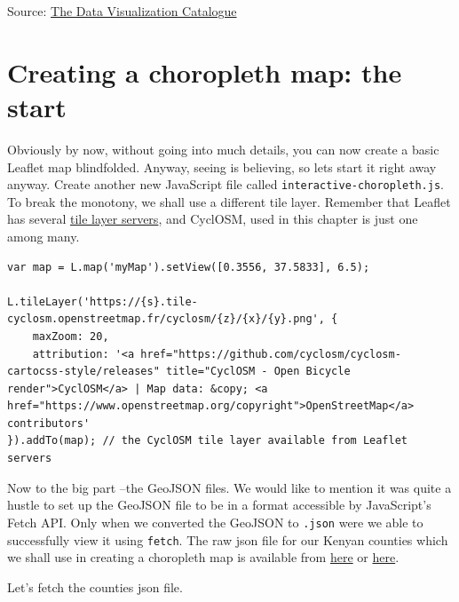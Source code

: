 \documentclass[
]{book}
\begin{document}
Source: \href{https://www.google.com/url?sa=i\&url=https\%3A\%2F\%2Fdatavizcatalogue.com\%2Fmethods\%2Fchoropleth.html\&psig=AOvVaw2doHr7xcU75mGuozmp6T5M\&ust=1689793060222000\&source=images\&cd=vfe\&opi=89978449\&ved=0CBMQjhxqFwoTCJiIu-v3mIADFQAAAAAdAAAAABAE}{The Data Visualization Catalogue}

\hypertarget{creating-a-choropleth-map-the-start}{%
\section{Creating a choropleth map: the start}\label{creating-a-choropleth-map-the-start}}

Obviously by now, without going into much details, you can now create a basic Leaflet map blindfolded. Anyway, seeing is believing, so lets start it right away anyway. Create another new JavaScript file called \texttt{interactive-choropleth.js}. To break the monotony, we shall use a different tile layer. Remember that Leaflet has several \href{https://leaflet-extras.github.io/leaflet-providers/preview/}{tile layer servers}, and CyclOSM, used in this chapter is just one among many.

\begin{verbatim}
var map = L.map('myMap').setView([0.3556, 37.5833], 6.5);

L.tileLayer('https://{s}.tile-cyclosm.openstreetmap.fr/cyclosm/{z}/{x}/{y}.png', {
    maxZoom: 20,
    attribution: '<a href="https://github.com/cyclosm/cyclosm-cartocss-style/releases" title="CyclOSM - Open Bicycle render">CyclOSM</a> | Map data: &copy; <a href="https://www.openstreetmap.org/copyright">OpenStreetMap</a> contributors'
}).addTo(map); // the CyclOSM tile layer available from Leaflet servers
\end{verbatim}

Now to the big part --the GeoJSON files. We would like to mention it was quite a hustle to set up the GeoJSON file to be in a format accessible by JavaScript's Fetch API. Only when we converted the GeoJSON to \texttt{.json} were we able to successfully view it using \texttt{fetch}. The raw json file for our Kenyan counties which we shall use in creating a choropleth map is available from \href{https://raw.githubusercontent.com/sammigachuhi/geojson_files/main/counties_json.json}{here} or \href{https://raw.githubusercontent.com/sammigachuhi/my-leaflet-project/main/geojson_files_updated/counties_json.json}{here}.

Let's fetch the counties json file.
\end{document}
